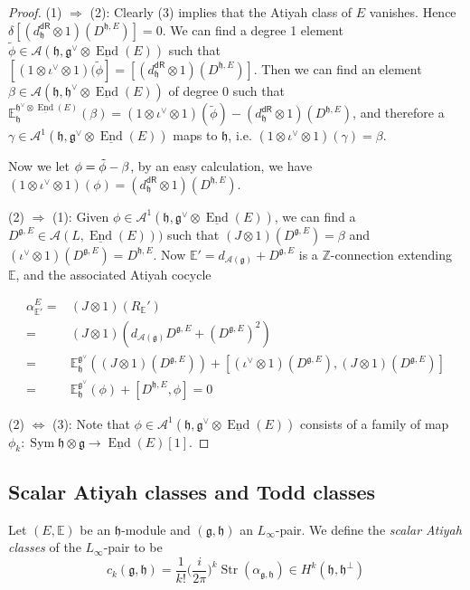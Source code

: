 \documentclass[12pt]{amsart}
\theoremstyle{definition}
\theoremstyle{remark}
\numberwithin{equation}{section}
\newcommand{\CA}{{\mathcal A}}
\newcommand{\Z}{{\mathbb{Z}}}
\newcommand{\1}{{\mathbb{1}}}
\newcommand{\g}{\mathfrak{g}}
\newcommand{\h}{\mathfrak{h}}
\newcommand{\dr}{\mathsf{dR}}
\newcommand{\End}{\operatorname{End}}
\newcommand{\sym}{\operatorname{Sym}}
\newcommand{\str}{\operatorname{Str}}
\begin{document}
\begin{proof}
     (1) $\Rightarrow$ (2): Clearly (3) implies that the Atiyah class of $E$ vanishes. Hence  $\delta[(d^{\dr}_{\h} \otimes 1)(D^{\h, E})] = 0$. We can find a degree 1 element $\tilde{\phi}\in \CA(\h, \g^{\vee}\otimes \underline{\End}(E))$ such that  $[(1\otimes \iota^{\vee} \otimes 1)(\tilde{\phi}] = [(d^{\dr}_{\h} \otimes 1)(D^{\h, E})]$. Then we can find an element $\beta \in \CA(\h, \h^{\vee}\otimes \underline{\End}(E))$ of degree 0 such that $\mathbb{E}^{\h^{\vee}\otimes \underline{\End}(E)}_{\h}(\beta) = (1\otimes \iota^{\vee} \otimes 1)(\tilde{\phi}) - (d^{\dr}_{\h} \otimes 1)(D^{\h, E})$, and therefore a $\gamma \in \CA^1(\h, \g^{\vee}\otimes \underline{\End}(E))$ maps to $\h$, i.e. $(1\otimes \iota^{\vee} \otimes 1)(\gamma) = \beta$.
     
     Now we let $\phi = \Tilde{\phi} - \beta$, by an easy calculation, we have 
     $(1\otimes \iota^{\vee} \otimes 1)(\phi) = (d_{\h}^{\dr} \otimes 1)(D^{\h, E})$.
     
     (2) $\Rightarrow$ (1): Given $\phi \in \CA^1(\h, \g^{\vee}\otimes \underline{\End}(E))$, we can find a $D^{\g, E}\in \CA(L, \underline{\End}(E)))$ such that $(J\otimes 1)(D^{\g, E}) = \beta$ and $(\iota^{\vee} \otimes 1)(D^{\g, E}) = D^{\h, E}$. Now $\mathbb{E}' = d_{\CA(\g)} + D^{\g, E}$ is a $\Z$-connection extending $\mathbb{E}$, and the associated Atiyah cocycle
     
     
     \begin{align*}
         \alpha^E_{\mathbb{E}'} =& (J\otimes 1)(R_\mathbb{E}')\\
         =& (J\otimes 1)(d_{\CA(\g)}D^{\g, E} +(D^{\g, E})^2 )\\
         =& \mathbb{E}_{\h}^{\g^{\vee}}( (J\otimes 1) (D^{\g, E})) + [(\iota^{\vee}\otimes 1)(D^{\g, E}),(J\otimes 1) (D^{\g, E})]\\
         =& \mathbb{E}_{\h}^{\g^{\vee}} (\phi) + [D^{\h, E},\phi] = 0
     \end{align*}
     
     
     (2) $\Leftrightarrow$ (3): Note that $\phi \in \CA^1(\h, \g^{\vee}\otimes \underline{\End}(E))$ consists of a family of map $\phi_k: \sym \h \otimes \g \to \underline{\End}(E)[1]$.
     
     
\end{proof}
\subsection{Scalar Atiyah classes and Todd classes}
Let $(E, \mathbb{E})$ be an $\h$-module and $(\g, \h)$ an $L_{\infty}$-pair. We define the {\it scalar Atiyah classes} of the $L_{\infty}$-pair to be 
\begin{equation*}
    c_k(\g, \h) = \frac{1}{k!}\bigg(\frac{i}{2\pi}\bigg)^k \str(\alpha_{\g, \h})\in H^{k}(\h, \h^{\perp})
\end{equation*}
\end{document}
